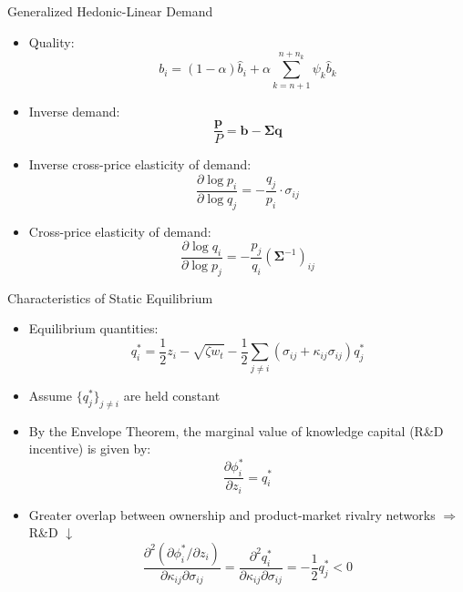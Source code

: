 \documentclass[
  10pt,
  aspectratio=169,   %
]{beamer}
\theoremstyle{plain}
\begin{document}
\begin{frame}{Generalized Hedonic-Linear Demand \citep{Pellegrino2024-dn}}
  \begin{itemize}
    \item Quality:
          \[
            b_{i}=\left(1-\alpha\right)\hat{b}_{i}+\alpha\sum_{k=n+1}^{n+n_{k}}\psi_{k}\hat{b}_{k}
          \]
    \item Inverse demand:
          \[
            \frac{\bm{p}}{P}=\bm{b}-\bm{\Sigma}\bm{q}
          \]
    \item Inverse cross-price elasticity of demand:
          \[
            \frac{\partial\log p_{i}}{\partial\log q_{j}}=-\frac{q_{j}}{p_{i}}\cdot\sigma_{ij}
          \]
    \item Cross-price elasticity of demand:
          \[
            \frac{\partial\log q_{i}}{\partial\log p_{j}}=-\frac{p_{j}}{q_{i}}(\bm{\Sigma}^{-1})_{ij}
          \]
  \end{itemize}
\end{frame}

\begin{frame}{Characteristics of Static Equilibrium}
  \label{static_equilibrium}
  \begin{itemize}
    \item Equilibrium quantities:
          \[q_i^* = \frac{1}{2} z_i - \sqrt{\zeta w_t} - \frac{1}{2}\sum_{j \neq i} (\sigma_{ij} + \kappa_{ij} \sigma_{ij}) q_j^* \] \pause
    \item Assume $\{q^*_{j}\}_{j\neq i}$ are held constant \pause
    \item By the Envelope Theorem, the marginal value of knowledge capital (R\&D incentive) is given by:
          \[
            \frac{\partial \phi_i^*}{\partial z_i} = q_i^*
          \]\pause
    \item Greater overlap between ownership and product-market rivalry networks $\Longrightarrow$ R\&D $\downarrow$
          \[  \frac{\partial^2 (\partial \phi_i^* / \partial z_i)}{\partial \kappa_{ij} \partial \sigma_{ij}} = \frac{\partial^2  q_i^*}{\partial \kappa_{ij} \partial \sigma_{ij}}= -\frac{1}{2}q_j^* < 0\]
  \end{itemize}
  \hyperlink{static_game}{}
\end{frame}
\end{document}
